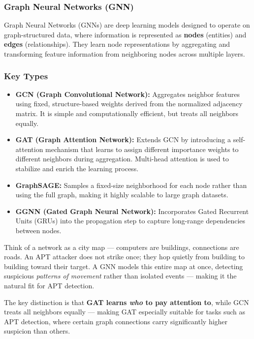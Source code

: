 \subsubsection{Graph Neural Networks (GNN)}


Graph Neural Networks (GNNs) are deep learning models designed to operate on
graph-structured data, where information is represented as \textbf{nodes}
(entities) and \textbf{edges} (relationships). They learn node representations
by aggregating and transforming feature information from neighboring nodes
across multiple layers.

\subsubsection{Key Types}

\begin{itemize}
    \item \textbf{GCN (Graph Convolutional Network):} Aggregates neighbor
    features using fixed, structure-based weights derived from the normalized
    adjacency matrix. It is simple and computationally efficient, but treats
    all neighbors equally.

    \item \textbf{GAT (Graph Attention Network):} Extends GCN by introducing
    a self-attention mechanism that learns to assign different importance
    weights to different neighbors during aggregation. Multi-head attention
    is used to stabilize and enrich the learning process.

    \item \textbf{GraphSAGE:} Samples a fixed-size neighborhood for each node
    rather than using the full graph, making it highly scalable to large
    graph datasets.

    \item \textbf{GGNN (Gated Graph Neural Network):} Incorporates Gated
    Recurrent Units (GRUs) into the propagation step to capture long-range
    dependencies between nodes.
\end{itemize}

Think of a network as a city map --- computers are buildings, connections are roads. An APT attacker does not strike once; they hop quietly from building to building toward their target. A GNN models this entire map at once, detecting suspicious \textit{patterns of movement} rather than isolated events --- making it the natural fit for APT detection.

The key distinction is that \textbf{GAT learns \textit{who} to pay attention
to}, while GCN treats all neighbors equally --- making GAT especially suitable
for tasks such as APT detection, where certain graph connections carry
significantly higher suspicion than others.

